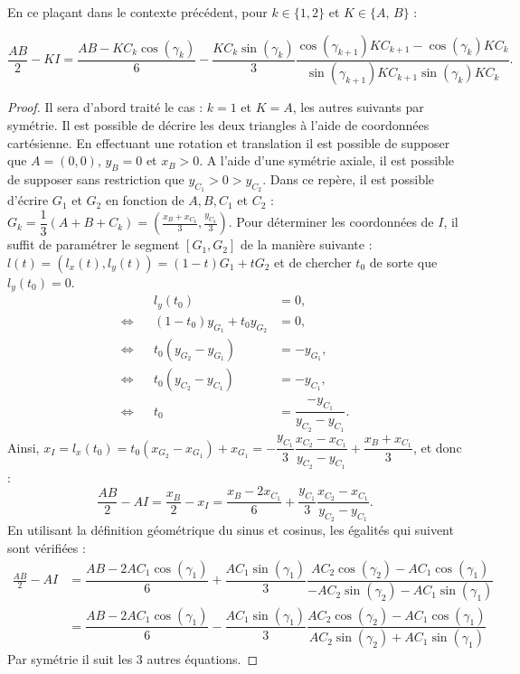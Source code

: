 \documentclass[12pt,a4paper]{article}
\begin{document}
	\begin{lm}\label{lm:equation_delta}
		En ce plaçant dans le contexte précédent, pour $k \in \{1,2\}$ et $K \in \{A,\,B\}$ :
	
		\begin{equation}\label{eq:delta_angle_gauche}
			\frac{AB}2 - KI = \dfrac{AB-KC_k\cos(\gamma_k)}6 - \dfrac{KC_k\sin(\gamma_k)}3\dfrac{\cos(\gamma_{k+1})KC_{k+1} - \cos(\gamma_k)KC_k}{\sin(\gamma_{k+1})KC_{k+1}\sin(\gamma_k)KC_k}.
		\end{equation}
	\end{lm}
	\begin{proof}
			Il sera d'abord traité le cas : $k=1$ et $K=A$, les autres suivants par symétrie. Il est possible de décrire les deux triangles à l'aide de coordonnées cartésienne. En effectuant une rotation et translation il est possible de supposer que $A=(0,0)$, $y_B = 0$ et $x_B >0$. A l'aide d'une symétrie axiale, il est possible de supposer sans restriction que $y_{C_1} > 0 > y_{C_2}$. Dans ce repère, il est possible d'écrire $G_1$ et $G_2$ en fonction de $A,B,C_1$ et $C_2$ :\\ $G_k = \dfrac13\left(A+B+C_k\right) = \left(\frac{x_B+x_{C_k}}3,\frac{y_{C_k}}3\right)$. Pour déterminer les coordonnées de $I$, il suffit de paramétrer le segment $[G_1,G_2]$ de la manière suivante : $l(t) = (l_x(t),l_y(t)) = (1-t)G_1 + tG_2$ et de chercher $t_0$ de sorte que $l_y(t_0) = 0$.
			\[\begin{aligned}
					 && l_y(t_0) &=0,\\
				\iff && (1-t_0)y_{G_1} + t_0 y_{G_2} &= 0,\\
				\iff && t_0(y_{G_2}-y_{G_1})&=-y_{G_1},\\
				\iff && t_0(y_{C_2}-y_{C_1})&=-y_{C_1},\\
				\iff && t_0&=\dfrac{-y_{C_1}}{y_{C_2}-y_{C_1}}.
			\end{aligned}\]
			Ainsi, $x_I = l_x(t_0) = t_0(x_{G_2}-x_{G_1}) + x_{G_1} = -\dfrac{y_{C_1}}3\dfrac{x_{C_2}-x_{C_1}}{y_{C_2}-y_{C_1}} + \dfrac{x_B+x_{C_1}}3$, et donc : 
			\[\frac{AB}2 - AI = \frac{x_B}2 - x_I = \dfrac{x_B-2x_{C_1}}6 + \dfrac{y_{C_1}}3\dfrac{x_{C_2}-x_{C_1}}{y_{C_2}-y_{C_1}}.\]
			En utilisant la définition géométrique du sinus et cosinus, les égalités qui suivent sont vérifiées : 
			\[\begin{aligned}
				\frac{AB}2 - AI &= \dfrac{AB-2AC_1\cos(\gamma_1)}6 + \dfrac{AC_1\sin(\gamma_1)}3\dfrac{AC_2\cos(\gamma_2)-AC_1\cos(\gamma_1)}{-AC_2\sin(\gamma_2)-AC_1\sin(\gamma_1)}\\
			& = \dfrac{AB-2AC_1\cos(\gamma_1)}6 - \dfrac{AC_1\sin(\gamma_1)}3\dfrac{AC_2\cos(\gamma_2)-AC_1\cos(\gamma_1)}{AC_2\sin(\gamma_2)+AC_1\sin(\gamma_1)}
			\end{aligned}\]
			Par symétrie il suit les 3 autres équations.
	\end{proof}
	
\end{document}
